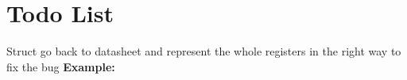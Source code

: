 \chapter{Todo List}
\hypertarget{todo}{}\label{todo}

\begin{DoxyRefList}
\item[Struct \doxylink{structSysCtl__Module__regs}{Sys\+Ctl\+\_\+\+Module\+\_\+regs} ]\label{todo__todo000001}%
%
go back to datasheet and represent the whole registers in the right way to fix the bug {\bfseries{Example\+:}} 
\end{DoxyRefList}